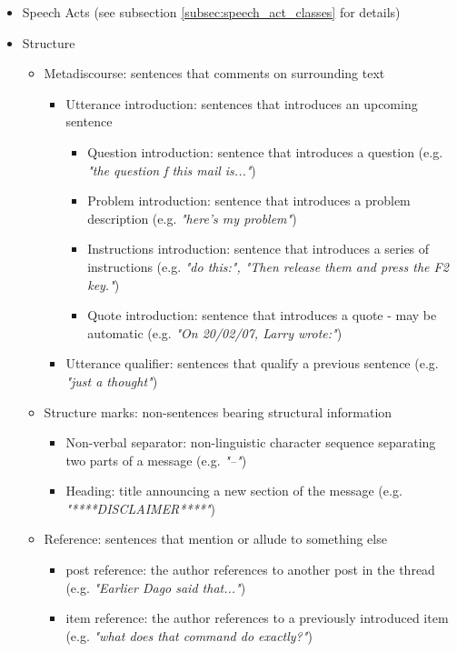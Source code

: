\documentclass[11pt]{article}
\begin{document}
\begin{itemize}
	\item Speech Acts (see subsection \ref{subsec:speech_act_classes} for details)
	\item Structure
		\begin{itemize}
			\item Metadiscourse: sentences that comments on surrounding text
				\begin{itemize}
					\item Utterance introduction: sentences that introduces an upcoming sentence
						\begin{itemize}
							\item Question introduction: sentence that introduces a question (e.g. \textit{"the question f this mail is..."})
							\item Problem introduction: sentence that introduces a problem description (e.g. \textit{"here's my problem"})
							\item Instructions introduction: sentence that introduces a series of instructions (e.g. \textit{"do this:", "Then release them and press the F2 key."})
							\item Quote introduction: sentence that introduces a quote - may be automatic (e.g. \textit{"On 20/02/07, Larry wrote:"})
						\end{itemize}
					\item Utterance qualifier: sentences that qualify a previous sentence (e.g. \textit{"just a thought"})
				\end{itemize}
			\item Structure marks: non-sentences bearing structural information
				\begin{itemize}
					\item Non-verbal separator: non-linguistic character sequence separating two parts of a message (e.g. \textit{"--"})
					\item Heading: title announcing a new section of the message (e.g. \textit{"****DISCLAIMER****"})
				\end{itemize}
			\item Reference: sentences that mention or allude to something else
				\begin{itemize}
					\item post reference: the author references to another post in the thread (e.g. \textit{"Earlier Dago said that..."})
					\item item reference: the author references to a previously introduced item (e.g. \textit{"what does that command do exactly?"})

\end{itemize}
\end{itemize}
\end{itemize}
\end{document}

